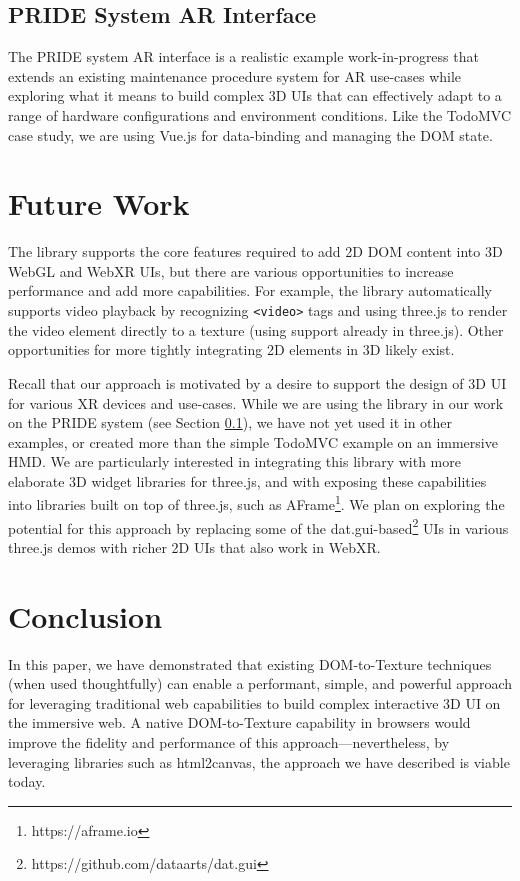 \documentclass[sigconf]{acmart}
\begin{document}
\subsection{PRIDE System AR Interface}
\label{section:pride}
The PRIDE system AR interface is a realistic example work-in-progress that extends an existing maintenance procedure system for AR use-cases while exploring what it means to build complex 3D UIs that can effectively adapt to a range of hardware configurations and environment conditions. Like the TodoMVC case study, we are using Vue.js for data-binding and managing the DOM state.


\section{Future Work}
The library supports the core features required to add 2D DOM content into 3D WebGL and WebXR UIs, but there are various opportunities to increase performance and add more capabilities.  For example, the library automatically supports video playback by recognizing \verb|<video>| tags and using three.js to render the video element directly to a texture (using support already in three.js). Other opportunities for more tightly integrating 2D elements in 3D likely exist.

Recall that our approach is motivated by a desire to support the design of 3D UI for various XR devices and use-cases. While we are using the library in our work on the PRIDE system (see Section \ref{section:pride}), we have not yet used it in other examples, or created more than the simple TodoMVC example on an immersive HMD.  We are particularly interested in integrating this library with more elaborate 3D widget libraries for three.js, and with exposing these capabilities into libraries built on top of three.js, such as AFrame\footnote{https://aframe.io}. We plan on exploring the potential for this approach by replacing some of the dat.gui-based\footnote{https://github.com/dataarts/dat.gui} UIs in various three.js demos with richer 2D UIs that also work in WebXR. 

\section{Conclusion}
In this paper, we have demonstrated that existing DOM-to-Texture techniques (when used thoughtfully) can enable a performant, simple, and powerful approach for leveraging traditional web capabilities to build complex interactive 3D UI on the immersive web. A native DOM-to-Texture capability in browsers would improve the fidelity and performance of this approach---nevertheless, by leveraging libraries such as html2canvas, the approach we have described is viable today. 
\end{document}
